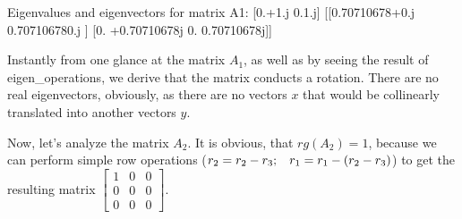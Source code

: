 \documentclass[letterpaper,10pt,english]{jupyterBook}
\begin{document}
\begin{sphinxVerbatim}[commandchars=\\\{\}]
  \PYG{p}{[}
    \PYG{p}{[} \PYG{p}{]}
    \PYG{p}{[} \PYG{p}{]}
\PYG{p}{]}

  \PYG{p}{[}
    \PYG{p}{[}  \PYG{p}{]}
    \PYG{p}{[}  \PYG{p}{]}
    \PYG{p}{[}  \PYG{p}{]}
\PYG{p}{]}

   
   

 
\end{sphinxVerbatim}

\begin{sphinxVerbatim}[commandchars=\\\{\}]
Eigenvalues and eigenvectors for matrix A1:
[0.+1.j 0.\PYGZhy{}1.j]
[[0.70710678+0.j         0.70710678\PYGZhy{}0.j        ]
 [0.        +0.70710678j 0.        \PYGZhy{}0.70710678j]]
\end{sphinxVerbatim}

\sphinxAtStartPar
Instantly from one glance at the matrix \(A_1\), as well as by seeing the result of eigen\_operations, we derive that the matrix conducts a rotation. There are no real eigenvectors, obviously, as there are no vectors \(x\) that would be collinearly translated into another vectors \(y\).

\sphinxAtStartPar
Now, let’s analyze the matrix \(A_2\). It is obvious, that \(rg(A_2) = 1\), because we can perform simple row operations (\(r_2 = r_2 - r_3; \hspace{3mm} r_1 = r_1 - (r_2 - r_3)\)) to get the resulting matrix \(
\begin{bmatrix}
1 & 0 & 0\\
0 & 0 & 0\\
0 & 0 & 0
\end{bmatrix}
\).
\end{document}
